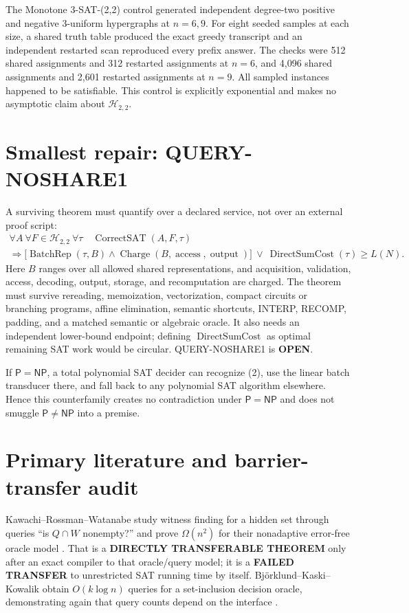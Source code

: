 \documentclass[11pt]{article}
\newcommand{\Pclass}{\mathsf P}
\newcommand{\NPclass}{\mathsf{NP}}
\begin{document}
The Monotone 3-SAT-(2,2) control generated independent degree-two positive and
negative 3-uniform hypergraphs at $n=6,9$.  For eight seeded samples at each
size, a shared truth table produced the exact greedy transcript and an
independent restarted scan reproduced every prefix answer.  The checks were
512 shared assignments and 312 restarted assignments at $n=6$, and 4,096
shared assignments and 2,601 restarted assignments at $n=9$.  All sampled
instances happened to be satisfiable.  This control is explicitly
exponential and makes no asymptotic claim about $\mathcal H_{2,2}$.

\section{Smallest repair: QUERY-NOSHARE1}
A surviving theorem must quantify over a declared service, not over an
external proof script:
\[
\begin{gathered}
\forall A\ \forall F\in\mathcal H_{2,2}\ \forall\tau
\quad \operatorname{CorrectSAT}(A,F,\tau)\\
\Longrightarrow
\bigl[\operatorname{BatchRep}(\tau,B)\wedge
\operatorname{Charge}(B,\operatorname{access},\operatorname{output})\bigr]
\ \lor\ 
\operatorname{DirectSumCost}(\tau)\ge L(N).
\end{gathered}
\tag{5}
\]
Here $B$ ranges over all allowed shared representations, and acquisition,
validation, access, decoding, output, storage, and recomputation are charged.
The theorem must survive rereading, memoization, vectorization, compact
circuits or branching programs, affine elimination, semantic shortcuts,
INTERP, RECOMP, padding, and a matched semantic or algebraic oracle.  It also
needs an independent lower-bound endpoint; defining
$\operatorname{DirectSumCost}$ as optimal remaining SAT work would be
circular.  QUERY-NOSHARE1 is \textbf{OPEN}.

If $\Pclass=\NPclass$, a total polynomial SAT decider can recognize (2), use
the linear batch transducer there, and fall back to any polynomial SAT
algorithm elsewhere.  Hence this counterfamily creates no contradiction
under $\Pclass=\NPclass$ and does not smuggle $\Pclass\ne\NPclass$ into a
premise.

\section{Primary literature and barrier-transfer audit}
Kawachi--Rossman--Watanabe study witness finding for a hidden set through
queries ``is $Q\cap W$ nonempty?'' and prove $\Omega(n^2)$ for their
nonadaptive error-free oracle model \cite{krw}.  That is a
\textbf{DIRECTLY TRANSFERABLE THEOREM} only after an exact compiler to that
oracle/query model; it is a \textbf{FAILED TRANSFER} to unrestricted SAT
running time by itself.  Bj\"orklund--Kaski--Kowalik obtain $O(k\log n)$
queries for a set-inclusion decision oracle, demonstrating again that query
counts depend on the interface \cite{bkk}.
\end{document}
